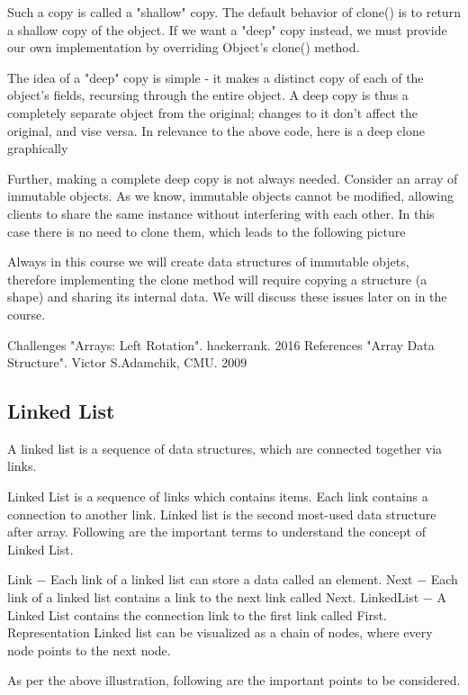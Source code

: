 Such a copy is called a "shallow" copy. The default behavior of clone() is to return a shallow copy of the object. If we want a "deep" copy instead, we must provide our own implementation by overriding Object's clone() method.

The idea of a "deep" copy is simple - it makes a distinct copy of each of the object's fields, recursing through the entire object. A deep copy is thus a completely separate object from the original; changes to it don't affect the original, and vise versa. In relevance to the above code, here is a deep clone graphically



Further, making a complete deep copy is not always needed. Consider an array of immutable objects. As we know, immutable objects cannot be modified, allowing clients to share the same instance without interfering with each other. In this case there is no need to clone them, which leads to the following picture



Always in this course we will create data structures of immutable objets, therefore implementing the clone method will require copying a structure (a shape) and sharing its internal data. We will discuss these issues later on in the course.

Challenges
"Arrays: Left Rotation". hackerrank. 2016
References
"Array Data Structure". Victor S.Adamchik, CMU. 2009

\subsection{Linked List}

A linked list is a sequence of data structures, which are connected together via links.

Linked List is a sequence of links which contains items. Each link contains a connection to another link. Linked list is the second most-used data structure after array. Following are the important terms to understand the concept of Linked List.

Link − Each link of a linked list can store a data called an element.
Next − Each link of a linked list contains a link to the next link called Next.
LinkedList − A Linked List contains the connection link to the first link called First.
Representation
Linked list can be visualized as a chain of nodes, where every node points to the next node.



As per the above illustration, following are the important points to be considered.

